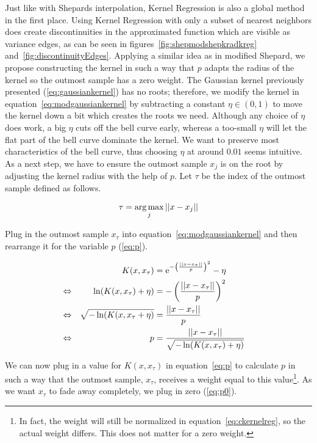 Just like with Shepards interpolation, Kernel Regression is also a global method in the first place. Using Kernel Regression with only a subset of nearest neighbors does create discontinuities in the approximated function which are visible as variance edges, as can be seen in figures~\ref{fig:shepmodshepkradkreg} and~\ref{fig:discontinuityEdges}. Applying a similar idea as in modified Shepard, we propose constructing the kernel in such a way that $p$ adapts the radius of the kernel so the outmost sample has a zero weight. The Gaussian kernel previously presented (\ref{eq:gaussiankernel}) has no roots; therefore, we modify the kernel in equation~\ref{eq:modgaussiankernel} by subtracting a constant $\eta \in (0,1)$ to move the kernel down a bit which creates the roots we need. %
Although any choice of $\eta$ does work, a big $\eta$ cuts off the bell curve early, whereas a too-small $\eta$ will let the flat part of the bell curve dominate the kernel. We want to preserve most characteristics of the bell curve, thus choosing $\eta$ at around $0.01$ seems intuitive.  As a next step, we have to ensure the outmost sample $x_j$ is on the root by adjusting the kernel radius with the help of $p$. Let $\tau$ be the index of the outmost sample defined as follows. 

\begin{align}
\label{eq:tau}
\tau = \operatorname*{arg\,max}_j ||x - x_j||
\end{align}

Plug in the outmost sample $x_\tau$ into equation~\ref{eq:modgaussiankernel} and then rearrange it for the variable $p$ (\ref{eq:p}). 

\begin{align}
&&K(x, x_\tau)&=\mathrm{e}^{-\left(\frac{||x-x_\tau||}{p}\right)^2} - \eta \label{eq:modgaussiankernel} &&\\
\Leftrightarrow&&\ln(K(x, x_\tau) + \eta) &= -\left(\frac{||x-x_\tau||}{p}\right)^2 \notag &&\\
\Leftrightarrow&& \sqrt{-\ln(K(x, x_\tau + \eta)} &= \frac{||x-x_\tau||}{p} \notag &&\\
\Leftrightarrow&& p &= \frac{||x-x_\tau||}{\sqrt{-\ln(K(x, x_\tau) + \eta)}} \label{eq:p}&&
\end{align}

We can now plug in a value for $K(x, x_\tau)$ in equation~\ref{eq:p} to calculate $p$ in such a way that the outmost sample, $x_\tau$, receives a weight equal to this value\footnote{In fact, the weight will still be normalized in equation~\ref{eq:ckernelreg}, so the actual weight differs. This does not matter for a zero weight.}. As we want $x_\tau$ to fade away completely, we plug in zero (\ref{eq:p0}).

